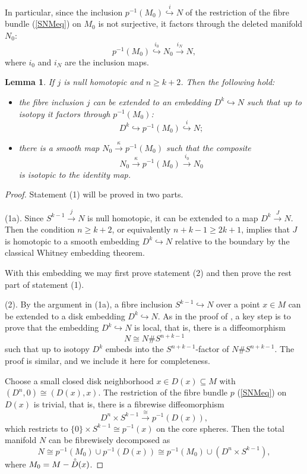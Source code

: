 \documentclass[a4]{amsart}
\newtheorem{lemma}[theorem]{Lemma}
\theoremstyle{definition}
\begin{document}
\begin{sloppypar}
In particular, since the inclusion $p^{-1}(M_0)\stackrel{i}{\hookrightarrow} N$ of the restriction of the fibre bundle (\ref{SNMeq}) on $M_0$ is not surjective, it factors through the deleted manifold $N_0$:
\[
p^{-1}(M_0)\stackrel{i_0}{\hookrightarrow}N_0\stackrel{i_N}{\longrightarrow} N,
\]
where $i_0$ and $i_N$ are the inclusion maps.
\begin{lemma}\label{emblemma}
If $j$ is null homotopic and $n\geq k+2$. Then the following hold:
\begin{itemize}
\item[(1).]
the fibre inclusion $j$ can be extended to an embedding $D^k\stackrel{}{\hookrightarrow} N$ such that up to isotopy it factors through $p^{-1}(M_0)$:
\[
D^k\stackrel{}{\hookrightarrow}  p^{-1}(M_0)\stackrel{i}{\hookrightarrow} N;
\]
\item[(2).]
there is a smooth map $N_0\stackrel{\kappa}{\longrightarrow} p^{-1}(M_0)$ such that the composite
\[
N_0\stackrel{\kappa}{\longrightarrow} p^{-1}(M_0)\stackrel{i_0}{\longrightarrow} N_0
\]
is isotopic to the identity map.
\end{itemize}
\end{lemma}
\begin{proof}
Statement (1) will be proved in two parts. 

(1a). Since $S^{k-1}\stackrel{j}{\longrightarrow} N$ is null homotopic, it can be extended to a map $D^k\stackrel{J}{\longrightarrow} N$. Then the condition $n\geq k+2$, or equivalently $n+k-1\geq 2k+1$, implies that $J$ is homotopic to a smooth embedding $D^k\stackrel{}{\hookrightarrow} N$ relative to the boundary by the classical Whitney embedding theorem. 

With this embedding we may first prove statement (2) and then prove the rest part of statement (1).

(2). By the argument in (1a), a fibre inclusion $S^{k-1}\hookrightarrow N$ over a point $x\in M$ can be extended to a disk embedding $D^k\stackrel{}{\hookrightarrow}N$. As in the proof of \cite[Lemma 3.1]{HT23}, a key step is to prove that the embedding $D^k\stackrel{}{\hookrightarrow} N$ is local, that is, there is a diffeomorphism 
\[
N\cong N\# S^{n+k-1}
\] 
such that up to isotopy $D^k$ embeds into the $S^{n+k-1}$-factor of $N\# S^{n+k-1}$. The proof is similar, and we include it here for completeness.  

Choose a small closed disk neighborhood $x \in D(x) \subseteq M$ with $(D^n, 0)\cong (D(x), x)$. The restriction of the fibre bundle $p$ (\ref{SNMeq}) on $D(x)$ is trivial, that is, there is a fibrewise diffeomorphism
\[
D^n\times  S^{k-1}\stackrel{\cong}{\longrightarrow} p^{-1}(D(x)),
\]
which restricts to $\{0\}\times S^{k-1}\cong p^{-1}(x)$ on the core spheres. Then the total manifold $N$ can be fibrewisely decomposed as
\[
N\cong p^{-1}(M_0)\cup p^{-1}(D(x))\cong p^{-1}(M_0)\cup (D^n\times  S^{k-1}),
\]
where $M_0=M-\accentset{\circ}{D}(x)$.


\end{proof}
\end{sloppypar}
\end{document}
